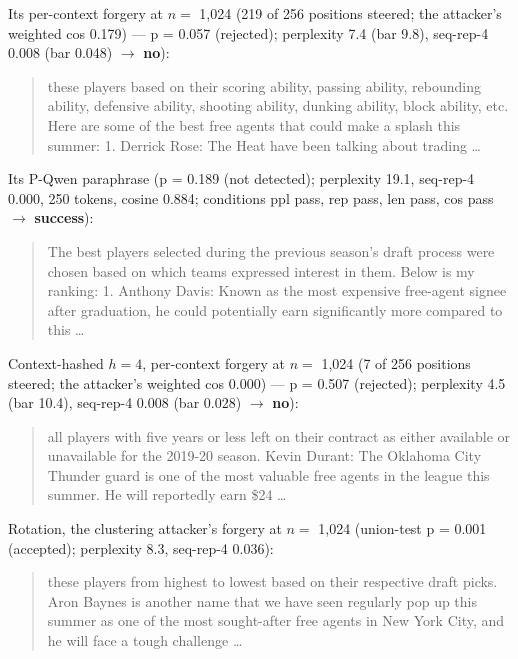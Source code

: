 \documentclass[11pt,letterpaper]{article}
\begin{document}
Its per-context forgery at \(n =\) 1,024 (219 of 256 positions steered; the attacker's weighted cos 0.179) --- p = 0.057 (rejected); perplexity 7.4 (bar 9.8), seq-rep-4 0.008 (bar 0.048) \ensuremath{\rightarrow} \textbf{no}):

\begin{quote}
these players based on their scoring ability, passing ability, rebounding ability, defensive ability, shooting ability, dunking ability, block ability, etc. Here are some of the best free agents that could make a splash this summer: 1. Derrick Rose: The Heat have been talking about trading \ldots{}
\end{quote}

Its P-Qwen paraphrase (p = 0.189 (not detected); perplexity 19.1, seq-rep-4 0.000, 250 tokens, cosine 0.884; conditions ppl pass, rep pass, len pass, cos pass \ensuremath{\rightarrow} \textbf{success}):

\begin{quote}
The best players selected during the previous season's draft process were chosen based on which teams expressed interest in them. Below is my ranking: 1. Anthony Davis: Known as the most expensive free-agent signee after graduation, he could potentially earn significantly more compared to this \ldots{}
\end{quote}

Context-hashed \(h = 4\), per-context forgery at \(n =\) 1,024 (7 of 256 positions steered; the attacker's weighted cos 0.000) --- p = 0.507 (rejected); perplexity 4.5 (bar 10.4), seq-rep-4 0.008 (bar 0.028) \ensuremath{\rightarrow} \textbf{no}):

\begin{quote}
all players with five years or less left on their contract as either available or unavailable for the 2019-20 season. Kevin Durant: The Oklahoma City Thunder guard is one of the most valuable free agents in the league this summer. He will reportedly earn \$24 \ldots{}
\end{quote}

Rotation, the clustering attacker's forgery at \(n =\) 1,024 (union-test p = 0.001 (accepted); perplexity 8.3, seq-rep-4 0.036):

\begin{quote}
these players from highest to lowest based on their respective draft picks. Aron Baynes is another name that we have seen regularly pop up this summer as one of the most sought-after free agents in New York City, and he will face a tough challenge \ldots{}
\end{quote}
\end{document}
